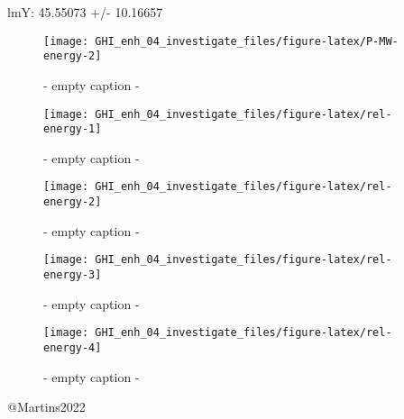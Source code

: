 \documentclass[
  10pt,
  a4paper,oneside]{article}
\begin{document}
lmY: 45.55073 +/- 10.16657

\begin{figure}[H]

{\centering \texttt{[image: GHI\_enh\_04\_investigate\_files/figure-latex/P-MW-energy-2]} 

}

\caption{ - empty caption - }\label{fig:P-MW-energy-2}
\end{figure}
\begin{figure}[H]

{\centering \texttt{[image: GHI\_enh\_04\_investigate\_files/figure-latex/rel-energy-1]} 

}

\caption{ - empty caption - }\label{fig:rel-energy-1}
\end{figure}
\begin{figure}[H]

{\centering \texttt{[image: GHI\_enh\_04\_investigate\_files/figure-latex/rel-energy-2]} 

}

\caption{ - empty caption - }\label{fig:rel-energy-2}
\end{figure}
\begin{figure}[H]

{\centering \texttt{[image: GHI\_enh\_04\_investigate\_files/figure-latex/rel-energy-3]} 

}

\caption{ - empty caption - }\label{fig:rel-energy-3}
\end{figure}
\begin{figure}[H]

{\centering \texttt{[image: GHI\_enh\_04\_investigate\_files/figure-latex/rel-energy-4]} 

}

\caption{ - empty caption - }\label{fig:rel-energy-4}
\end{figure}

@Martins2022
\end{document}
